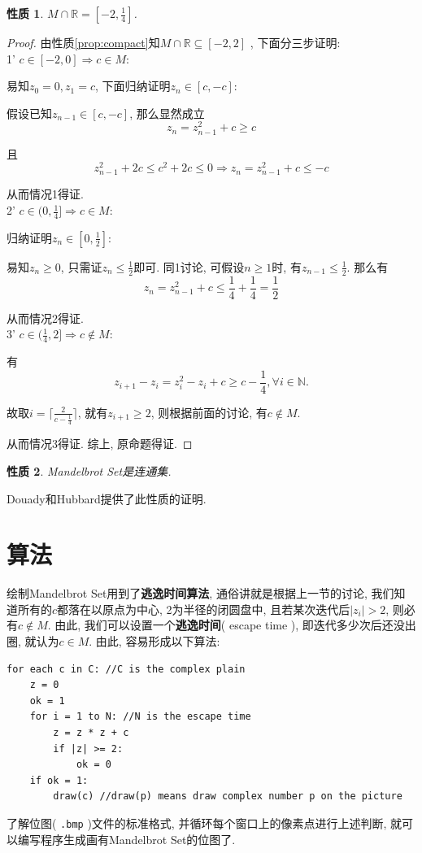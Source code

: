 \documentclass{ctexart}
\newtheorem{property}{性质}
\begin{document}
\begin{property}
$M \cap \mathbb{R} = [-2, \frac{1}{4}]$.
\end{property}
\begin{proof}
由性质\ref{prop:compact}知$M \cap \mathbb{R} \subseteq [-2, 2]$ , 下面分三步证明: \\
1' $c \in [-2, 0] \Rightarrow c \in M$: 
\par 易知$z_0=0, z_1=c$, 下面归纳证明$z_n \in [c, -c]$:
\par 假设已知$z_{n-1} \in [c, -c]$, 那么显然成立
$$z_n = z_{n-1}^2+c \ge c$$
\par 且
$$z_{n-1}^2+2c \le c^2+2c \le 0 \Rightarrow z_n = z_{n-1}^2+c \le -c$$
\par 从而情况1得证. \\
2' $c \in (0, \frac{1}{4}] \Rightarrow c \in M$:
\par 归纳证明$z_n \in [0, \frac{1}{2}]$:
\par 易知$z_n \ge 0$, 只需证$z_n \le \frac{1}{2}$即可. 同1讨论, 可假设$n \ge 1$时, 有$z_{n-1} \le \frac{1}{2}$. 那么有
$$z_n=z_{n-1}^2+c \le \frac{1}{4}+\frac{1}{4} = \frac{1}{2}$$
\par 从而情况2得证. \\
3' $c \in (\frac{1}{4}, 2] \Rightarrow c \notin M$:
\par 有
$$z_{i+1}-z_i = z_i^2-z_i+c \ge c-\frac{1}{4}, \forall i \in \mathbb{N}.$$
\par 故取$i=\lceil \frac{2}{c-\frac{1}{4}} \rceil$, 就有$z_{i+1} \ge 2$, 则根据前面的讨论, 有$c \notin M$.
\par 从而情况3得证. 综上, 原命题得证.
\end{proof}

\begin{property}
Mandelbrot Set是连通集.
\end{property}
\par Douady和Hubbard提供了此性质的证明.

\section{算法}
绘制Mandelbrot Set用到了\textbf{逃逸时间算法}, 通俗讲就是根据上一节的讨论, 我们知道所有的$c$都落在以原点为中心, 2为半径的闭圆盘中, 且若某次迭代后$|z_i| > 2$, 则必有$c \notin M$. 由此, 我们可以设置一个\textbf{逃逸时间}( escape time ), 即迭代多少次后还没出圈, 就认为$c \in M$. 由此, 容易形成以下算法:
\begin{verbatim}
for each c in C: //C is the complex plain
    z = 0
    ok = 1
    for i = 1 to N: //N is the escape time
        z = z * z + c
        if |z| >= 2:
            ok = 0
    if ok = 1:
        draw(c) //draw(p) means draw complex number p on the picture
\end{verbatim}
\par 了解位图( \verb!.bmp! )文件的标准格式, 并循环每个窗口上的像素点进行上述判断, 就可以编写程序生成画有Mandelbrot Set的位图了.
\end{document}
